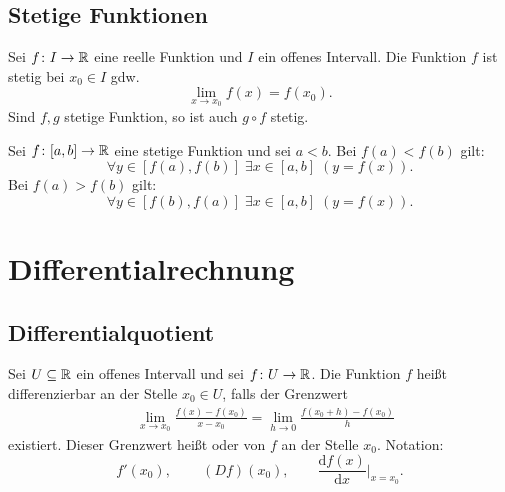 \subsection{Stetige Funktionen}
Sei $f\colon I\to\mathbb R$ eine reelle Funktion und $I$ ein offenes
Intervall. Die Funktion $f$ ist stetig bei $x_0\in I$ gdw.
\begin{equation}
\lim_{x\to x_0} f(x)=f(x_0).
\end{equation}
Sind $f,g$ stetige Funktion, so ist auch $g\circ f$ stetig.

\noindent
{}
Sei $f\colon [a,b]\to\mathbb R$ eine stetige Funktion und sei
$a<b$. Bei $f(a)<f(b)$ gilt:
\begin{equation}
\forall y{\in}[f(a),f(b)]\;\exists x{\in}[a,b]\;(y=f(x)).
\end{equation}
Bei $f(a)>f(b)$ gilt:
\begin{equation}
\forall y{\in}[f(b),f(a)]\;\exists x{\in}[a,b]\;(y=f(x)).
\end{equation}

\newpage
\section{Differentialrechnung}
\subsection{Differentialquotient}
\begin{definition}[Differentialquotient]
Sei $U\subseteq\mathbb R$ ein offenes Intervall
und sei $f\colon U\to\mathbb R$. Die Funktion $f$ heißt
differenzierbar
an der Stelle $x_0\in U$, falls der Grenzwert
\begin{equation}
\begin{split}
&\lim_{x\to x_0} \frac{f(x)-f(x_0)}{x-x_0}
= \lim_{h\to 0}\frac{f(x_0+h)-f(x_0)}{h}
\end{split}
\end{equation}
existiert. Dieser Grenzwert heißt
 oder 
von $f$ an der Stelle $x_0$. Notation:
\begin{equation}
f'(x_0),\,\qquad (Df)(x_0),\qquad \frac{\mathrm df(x)}{\mathrm dx}\Big|_{x=x_0}.
\end{equation}
\end{definition}

